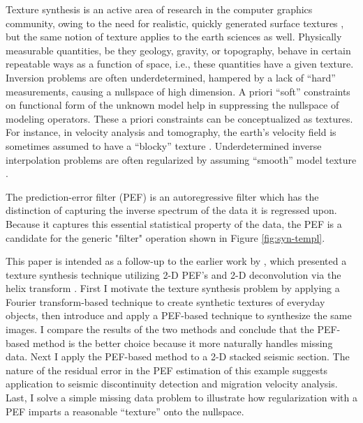 	\par
	Texture synthesis is an active area of research in the computer 
	graphics community, owing to the need for realistic, quickly generated surface 
	textures {\small \cite[]{simoncelli,heeger,brown-mao}}, but the same notion of texture 
	applies to the earth sciences as well.  Physically measurable quantities, be they
	geology, gravity, or topography, behave in certain repeatable ways as a function of
	space, i.e., these quantities have a given texture.  Inversion problems are often
	underdetermined, hampered by a lack of ``hard'' measurements, causing a nullspace of high 
	dimension.  A priori ``soft'' constraints on functional form of the unknown model  
	help in suppressing the nullspace of modeling operators.  These a priori constraints 
	can be conceptualized as textures.  For instance, in velocity analysis and 
	tomography, the earth's velocity field is sometimes assumed to have a ``blocky''
	texture {\small \cite[]{Clapp.sep.97.bob1}}.  Underdetermined inverse interpolation 
	problems are often regularized by assuming ``smooth'' model texture {\small \cite[]{gee}}.

	\par
	The prediction-error filter (PEF) is an autoregressive filter which has the distinction 
	of capturing the inverse spectrum of the data it is regressed upon.  
	Because it captures this essential statistical property of the data, the PEF is a 
	candidate for the generic "filter" operation shown in Figure \ref{fig:syn-templ}.

	\par This paper is intended as a follow-up to the earlier work
	by \cite{claerbout-brown}, which presented a texture synthesis
	technique utilizing 2-D PEF's and 2-D deconvolution via the
	helix transform {\small \cite[]{helix}}.  First I motivate the
	texture synthesis problem by applying a Fourier
	transform-based technique to create synthetic textures of
	everyday objects, then introduce and apply a PEF-based
	technique to synthesize the same images.  I compare the
	results of the two methods and conclude that the PEF-based
	method is the better choice because it more naturally handles
	missing data.  Next I apply the PEF-based method to a 2-D
	stacked seismic section.  The nature of the residual error in
	the PEF estimation of this example suggests application to
	seismic discontinuity detection and migration velocity
	analysis.  Last, I solve a simple missing data problem to
	illustrate how regularization with a PEF imparts a reasonable
	``texture'' onto the nullspace.

